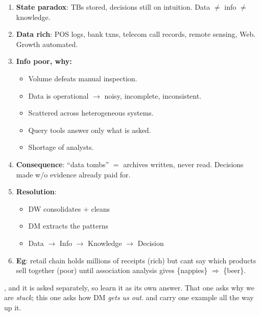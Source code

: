 \begin{enumerate}
  \item \textbf{State paradox}: TBs stored, decisions still on intuition. Data $\ne$ info $\ne$ knowledge.
  \item \textbf{Data rich}: POS logs, bank txns, telecom call records, remote sensing, Web. Growth automated.
  \item \textbf{Info poor, why:}
  \begin{itemize}
    \item Volume defeats manual inspection.
    \item Data is operational $\rightarrow$ noisy, incomplete, inconsistent.
    \item Scattered across heterogeneous systems.
    \item Query tools answer only what is asked.
    \item Shortage of analysts.
  \end{itemize}
  \item \textbf{Consequence}: ``data tombs'' $=$ archives written, never read. Decisions made w/o evidence already paid for.
  \item \textbf{Resolution}:
  \begin{itemize}
    \item DW consolidates $+$ cleans
    \item DM extracts the patterns
    \item Data $\rightarrow$ Info $\rightarrow$ Knowledge $\rightarrow$ Decision
  \end{itemize}
  \item \textbf{Eg}: retail chain holds millions of receipts (rich) but cant say which products sell together (poor)
        until association analysis gives \{nappies\} $\Rightarrow$ \{beer\}.
\end{enumerate}

\vspace{3pt}
{\color{sub}\footnotesize {} \gap {}, and it is
asked separately, so learn it as its own answer. That one asks why we are \emph{stuck}; this one
asks how DM \emph{gets us out}.  and carry one
example all the way up it. \added}

